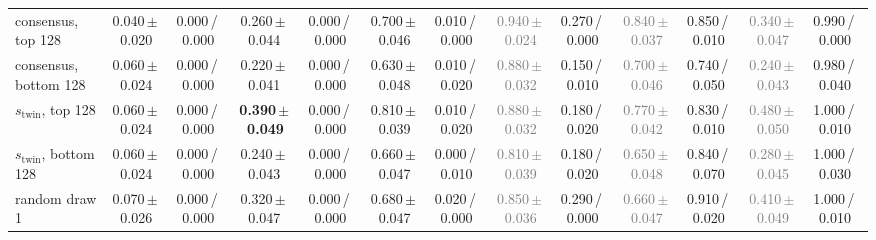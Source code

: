 \begin{tabular}{@{}lcccccccccccc@{}}
consensus, top 128 & 0.040\,{\scriptsize$\pm$\,0.020} & {\scriptsize 0.000\,/\,0.000} & 0.260\,{\scriptsize$\pm$\,0.044} & {\scriptsize 0.000\,/\,0.000} & 0.700\,{\scriptsize$\pm$\,0.046} & {\scriptsize 0.010\,/\,0.000} & \textcolor{gray}{0.940\,{\scriptsize$\pm$\,0.024}} & {\scriptsize 0.270\,/\,0.000} & \textcolor{gray}{0.840\,{\scriptsize$\pm$\,0.037}} & {\scriptsize 0.850\,/\,0.010} & \textcolor{gray}{0.340\,{\scriptsize$\pm$\,0.047}} & {\scriptsize 0.990\,/\,0.000} \\
consensus, bottom 128 & 0.060\,{\scriptsize$\pm$\,0.024} & {\scriptsize 0.000\,/\,0.000} & 0.220\,{\scriptsize$\pm$\,0.041} & {\scriptsize 0.000\,/\,0.000} & 0.630\,{\scriptsize$\pm$\,0.048} & {\scriptsize 0.010\,/\,0.020} & \textcolor{gray}{0.880\,{\scriptsize$\pm$\,0.032}} & {\scriptsize 0.150\,/\,0.010} & \textcolor{gray}{0.700\,{\scriptsize$\pm$\,0.046}} & {\scriptsize 0.740\,/\,0.050} & \textcolor{gray}{0.240\,{\scriptsize$\pm$\,0.043}} & {\scriptsize 0.980\,/\,0.040} \\
$s_{\text{twin}}$, top 128 & 0.060\,{\scriptsize$\pm$\,0.024} & {\scriptsize 0.000\,/\,0.000} & \textbf{0.390\,{\scriptsize$\pm$\,0.049}} & {\scriptsize 0.000\,/\,0.000} & 0.810\,{\scriptsize$\pm$\,0.039} & {\scriptsize 0.010\,/\,0.020} & \textcolor{gray}{0.880\,{\scriptsize$\pm$\,0.032}} & {\scriptsize 0.180\,/\,0.020} & \textcolor{gray}{0.770\,{\scriptsize$\pm$\,0.042}} & {\scriptsize 0.830\,/\,0.010} & \textcolor{gray}{0.480\,{\scriptsize$\pm$\,0.050}} & {\scriptsize 1.000\,/\,0.010} \\
$s_{\text{twin}}$, bottom 128 & 0.060\,{\scriptsize$\pm$\,0.024} & {\scriptsize 0.000\,/\,0.000} & 0.240\,{\scriptsize$\pm$\,0.043} & {\scriptsize 0.000\,/\,0.000} & 0.660\,{\scriptsize$\pm$\,0.047} & {\scriptsize 0.000\,/\,0.010} & \textcolor{gray}{0.810\,{\scriptsize$\pm$\,0.039}} & {\scriptsize 0.180\,/\,0.020} & \textcolor{gray}{0.650\,{\scriptsize$\pm$\,0.048}} & {\scriptsize 0.840\,/\,0.070} & \textcolor{gray}{0.280\,{\scriptsize$\pm$\,0.045}} & {\scriptsize 1.000\,/\,0.030} \\
\midrule
random draw 1 & 0.070\,{\scriptsize$\pm$\,0.026} & {\scriptsize 0.000\,/\,0.000} & 0.320\,{\scriptsize$\pm$\,0.047} & {\scriptsize 0.000\,/\,0.000} & 0.680\,{\scriptsize$\pm$\,0.047} & {\scriptsize 0.020\,/\,0.000} & \textcolor{gray}{0.850\,{\scriptsize$\pm$\,0.036}} & {\scriptsize 0.290\,/\,0.000} & \textcolor{gray}{0.660\,{\scriptsize$\pm$\,0.047}} & {\scriptsize 0.910\,/\,0.020} & \textcolor{gray}{0.410\,{\scriptsize$\pm$\,0.049}} & {\scriptsize 1.000\,/\,0.010} \\

\end{tabular}
